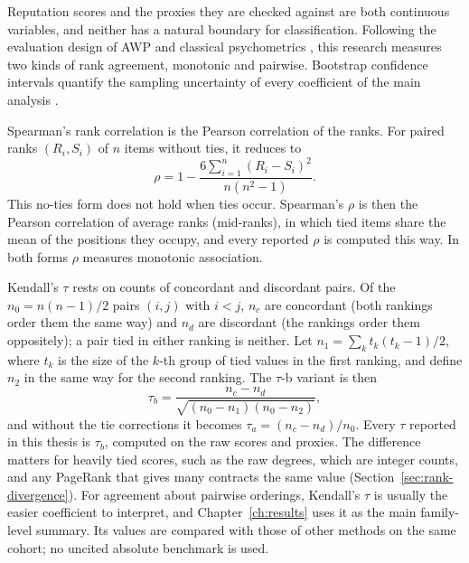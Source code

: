 
Reputation scores and the proxies they are checked against are both continuous variables, and neither has a natural boundary for classification. Following the evaluation design of AWP \parencite{do2023awp} and classical psychometrics \parencite{cronbach1955construct}, this research measures two kinds of rank agreement, monotonic and pairwise. Bootstrap confidence intervals quantify the sampling uncertainty of every coefficient of the main analysis \parencite{efron1979bootstrap}.

Spearman's rank correlation \parencite{spearman1904proof} is the Pearson correlation of the ranks. For paired ranks $(R_i,S_i)$ of $n$ items without ties, it reduces to
\begin{equation}
\rho = 1 - \frac{6\sum_{i=1}^n (R_i-S_i)^2}{n(n^2-1)}.
\label{eq:spearman}
\end{equation}
This no-ties form does not hold when ties occur. Spearman's $\rho$ is then the Pearson correlation of average ranks (mid-ranks), in which tied items share the mean of the positions they occupy, and every reported $\rho$ is computed this way. In both forms $\rho$ measures monotonic association.

Kendall's $\tau$ \parencite{kendall1938rank} rests on counts of concordant and discordant pairs. Of the $n_0=n(n-1)/2$ pairs $(i,j)$ with $i<j$, $n_c$ are concordant (both rankings order them the same way) and $n_d$ are discordant (the rankings order them oppositely); a pair tied in either ranking is neither. Let $n_1=\sum_k t_k(t_k-1)/2$, where $t_k$ is the size of the $k$-th group of tied values in the first ranking, and define $n_2$ in the same way for the second ranking. The $\tau$-b variant is then
\begin{equation}
\tau_b = \frac{n_c - n_d}{\sqrt{(n_0-n_1)(n_0-n_2)}},
\label{eq:kendall}
\end{equation}
and without the tie corrections it becomes $\tau_a=(n_c-n_d)/n_0$. Every $\tau$ reported in this thesis is $\tau_b$, computed on the raw scores and proxies. The difference matters for heavily tied scores, such as the raw degrees, which are integer counts, and any PageRank that gives many contracts the same value (Section~\ref{sec:rank-divergence}). For agreement about pairwise orderings, Kendall's $\tau$ is usually the easier coefficient to interpret, and Chapter~\ref{ch:results} uses it as the main family-level summary. Its values are compared with those of other methods on the same cohort; no uncited absolute benchmark is used.

